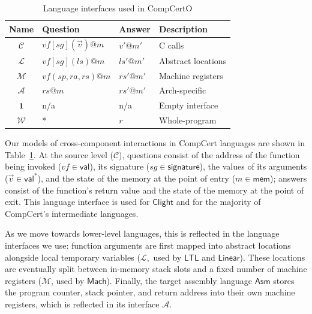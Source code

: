 \documentclass[11pt,oneside,draft]{book}
\theoremstyle{definition}
\newcommand{\kw}[1]{\ensuremath{ \mathsf{#1} }}
\newcommand{\figsize}{}
\begin{document}
\begin{table} %
  \figsize
  \begin{tabular}{clll}
    \hline
    Name & Question & Answer & Description \\
    \hline
    $\mathcal{C}$ &
      $\mathit{vf}[\mathit{sg}](\vec{v})@m$ & $v'@m'$ &
      C calls \\
    $\mathcal{L}$ &
      $\mathit{vf}[\mathit{sg}](\mathit{ls})@m$ & $\mathit{ls}'@m'$ &
      Abstract locations \\
    $\mathcal{M}$ &
      $\mathit{vf}(\mathit{sp},\mathit{ra},\mathit{rs})@m$ & $\mathit{rs}'@m'$ &
      Machine registers \\
    $\mathcal{A}$ &
      $\mathit{rs}@m$ & $\mathit{rs}'@m'$ &
      Arch-specific \\
    $\mathbf{1}$ & n/a & n/a &
      Empty interface \\
    $\mathcal{W}$ & * & $r$ &
      Whole-program \\
    \hline
  \end{tabular}
  \caption{Language interfaces used in CompCertO}
  \label{tbl:li}
\end{table}

Our models of cross-component interactions in CompCert languages
are shown in Table~\ref{tbl:li}.
At the source level ($\mathcal{C}$),
questions consist of
the address of the function being invoked
($\mathit{vf} \in \kw{val}$),
its signature
($\mathit{sg} \in \kw{signature}$),
the values of its arguments
($\vec{v} \in \kw{val}^*$),
and the state of the memory at the point of entry
($m \in \kw{mem}$);
answers
consist of the function's return value
and the state of the memory at the point of exit.
This language interface is used for \kw{Clight} and
for the majority of CompCert's intermediate languages.

As we move towards lower-level languages,
this is reflected in the language interfaces we use:
function arguments are first mapped into
abstract locations alongside local temporary variables
($\mathcal{L}$,~used by \kw{LTL} and \kw{Linear}).
These locations are eventually split between
in-memory stack slots and a fixed number of machine registers
($\mathcal{M}$, used by \kw{Mach}).
Finally, the target assembly language \kw{Asm}
stores the program counter, stack pointer,
and return address into their own machine registers,
which is reflected in its interface $\mathcal{A}$.
\end{document}
